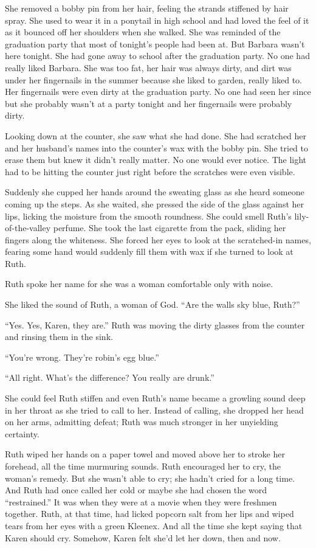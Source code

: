 \documentclass[twoside,10pt]{book}
\begin{document}
She removed a bobby pin from her hair, feeling the strands stiffened by
hair spray. She used to wear it in a ponytail in high school and had
loved the feel of it as it bounced off her shoulders when she walked.
She was reminded of the graduation party that most of tonight's people
had been at. But Barbara wasn't here tonight. She had gone away to
school after the graduation party. No one had really liked Barbara. She
was too fat, her hair was always dirty, and dirt was under her
fingernails in the summer because she liked to garden, really liked to.
Her fingernails were even dirty at the graduation party. No one had seen
her since but she probably wasn't at a party tonight and her fingernails
were probably dirty.

Looking down at the counter, she saw what she had done. She had
scratched her and her husband's names into the counter's wax with the
bobby pin. She tried to erase them but knew it didn't really matter. No
one would ever notice. The light had to be hitting the counter just
right before the scratches were even visible.

Suddenly she cupped her hands around the sweating glass as she heard
someone coming up the steps. As she waited, she pressed the side of the
glass against her lips, licking the moisture from the smooth roundness.
She could smell Ruth's lily-of-the-valley perfume. She took the last
cigarette from the pack, sliding her fingers along the whiteness. She
forced her eyes to look at the scratched-in names, fearing some hand
would suddenly fill them with wax if she turned to look at Ruth.

Ruth spoke her name for she was a woman comfortable only with noise.

She liked the sound of Ruth, a woman of God. ``Are the walls sky blue,
Ruth?''

``Yes. Yes, Karen, they are.'' Ruth was moving the dirty glasses from
the counter and rinsing them in the sink.

``You're wrong. They're robin's egg blue.''

``All right. What's the difference? You really are drunk.''

She could feel Ruth stiffen and even Ruth's name became a growling sound
deep in her throat as she tried to call to her. Instead of calling, she
dropped her head on her arms, admitting defeat; Ruth was much stronger
in her unyielding certainty.

Ruth wiped her hands on a paper towel and moved above her to stroke her
forehead, all the time murmuring sounds. Ruth encouraged her to cry, the
woman's remedy. But she wasn't able to cry; she hadn't cried for a long
time. And Ruth had once called her cold or maybe she had chosen the word
``restrained.'' It was when they were at a movie when they were freshmen
together. Ruth, at that time, had licked popcorn salt from her lips and
wiped tears from her eyes with a green Kleenex. And all the time she
kept saying that Karen should cry. Somehow, Karen felt she'd let her
down, then and now.
\end{document}
